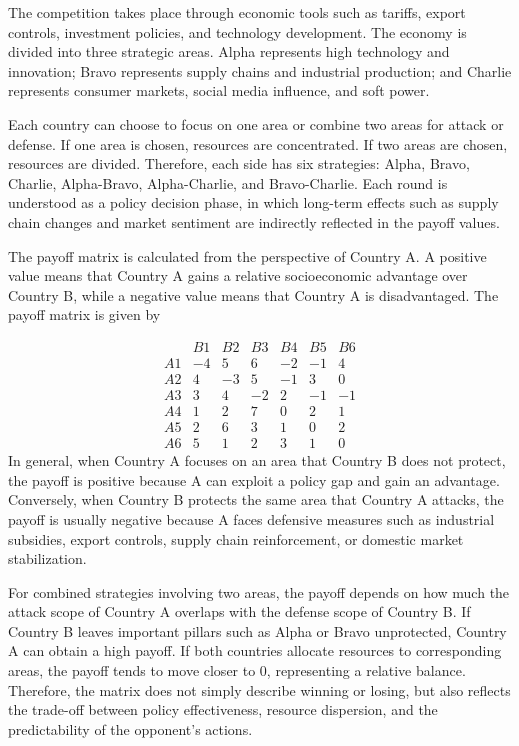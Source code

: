 \documentclass[12pt,a4paper]{article}
\begin{document}
The competition takes place through economic tools such as tariffs, export controls, investment policies, and technology development. The economy is divided into three strategic areas. Alpha represents high technology and innovation; Bravo represents supply chains and industrial production; and Charlie represents consumer markets, social media influence, and soft power.

Each country can choose to focus on one area or combine two areas for attack or defense. If one area is chosen, resources are concentrated. If two areas are chosen, resources are divided. Therefore, each side has six strategies: Alpha, Bravo, Charlie, Alpha-Bravo, Alpha-Charlie, and Bravo-Charlie. Each round is understood as a policy decision phase, in which long-term effects such as supply chain changes and market sentiment are indirectly reflected in the payoff values.

The payoff matrix is calculated from the perspective of Country A. A positive value means that Country A gains a relative socioeconomic advantage over Country B, while a negative value means that Country A is disadvantaged. The payoff matrix is given by

\begingroup
\small
\renewcommand{\arraystretch}{0.75}
\setlength{\arraycolsep}{4pt}
\[
\begin{array}{c|cccccc}
 & B1 & B2 & B3 & B4 & B5 & B6 \\
\hline
A1 & -4 & 5 & 6 & -2 & -1 & 4 \\
A2 & 4 & -3 & 5 & -1 & 3 & 0 \\
A3 & 3 & 4 & -2 & 2 & -1 & -1 \\
A4 & 1 & 2 & 7 & 0 & 2 & 1 \\
A5 & 2 & 6 & 3 & 1 & 0 & 2 \\
A6 & 5 & 1 & 2 & 3 & 1 & 0
\end{array}
\]
\endgroup
In general, when Country A focuses on an area that Country B does not protect, the payoff is positive because A can exploit a policy gap and gain an advantage. Conversely, when Country B protects the same area that Country A attacks, the payoff is usually negative because A faces defensive measures such as industrial subsidies, export controls, supply chain reinforcement, or domestic market stabilization.

For combined strategies involving two areas, the payoff depends on how much the attack scope of Country A overlaps with the defense scope of Country B. If Country B leaves important pillars such as Alpha or Bravo unprotected, Country A can obtain a high payoff. If both countries allocate resources to corresponding areas, the payoff tends to move closer to $0$, representing a relative balance. Therefore, the matrix does not simply describe winning or losing, but also reflects the trade-off between policy effectiveness, resource dispersion, and the predictability of the opponent's actions.
\end{document}
